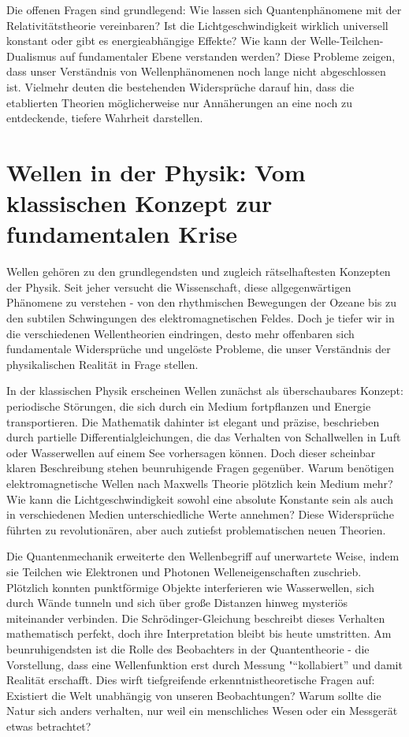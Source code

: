 Die offenen Fragen sind grundlegend: Wie lassen sich Quantenphänomene mit der Relativitätstheorie vereinbaren? Ist die Lichtgeschwindigkeit wirklich universell konstant oder gibt es
energieabhängige Effekte? Wie kann der Welle-Teilchen-Dualismus auf fundamentaler Ebene verstanden werden? Diese Probleme zeigen, dass unser Verständnis von Wellenphänomenen noch lange
nicht abgeschlossen ist. Vielmehr deuten die bestehenden Widersprüche darauf hin, dass die etablierten Theorien möglicherweise nur Annäherungen an eine noch zu entdeckende, tiefere
Wahrheit darstellen.

\section{Wellen in der Physik: Vom klassischen Konzept zur fundamentalen Krise}
Wellen gehören zu den grundlegendsten und zugleich rätselhaftesten Konzepten der Physik. Seit jeher versucht die Wissenschaft, diese allgegenwärtigen Phänomene zu verstehen - von den
rhythmischen Bewegungen der Ozeane bis zu den subtilen Schwingungen des elektromagnetischen Feldes. Doch je tiefer wir in die verschiedenen Wellentheorien eindringen, desto mehr offenbaren
sich fundamentale Widersprüche und ungelöste Probleme, die unser Verständnis der physikalischen Realität in Frage stellen.

In der klassischen Physik erscheinen Wellen zunächst als überschaubares Konzept: periodische Störungen, die sich durch ein Medium fortpflanzen und Energie transportieren. Die Mathematik
dahinter ist elegant und präzise, beschrieben durch partielle Differentialgleichungen, die das Verhalten von Schallwellen in Luft oder Wasserwellen auf einem See vorhersagen können.
Doch dieser scheinbar klaren Beschreibung stehen beunruhigende Fragen gegenüber. Warum benötigen elektromagnetische Wellen nach Maxwells Theorie plötzlich kein Medium mehr? Wie kann die
Lichtgeschwindigkeit sowohl eine absolute Konstante sein als auch in verschiedenen Medien unterschiedliche Werte annehmen? Diese Widersprüche führten zu revolutionären, aber auch zutiefst
problematischen neuen Theorien.

Die Quantenmechanik erweiterte den Wellenbegriff auf unerwartete Weise, indem sie Teilchen wie Elektronen und Photonen Welleneigenschaften zuschrieb. Plötzlich konnten punktförmige Objekte
interferieren wie Wasserwellen, sich durch Wände tunneln und sich über große Distanzen hinweg mysteriös miteinander verbinden. Die Schrödinger-Gleichung beschreibt dieses Verhalten mathematisch
perfekt, doch ihre Interpretation bleibt bis heute umstritten. Am beunruhigendsten ist die Rolle des Beobachters in der Quantentheorie - die Vorstellung, dass eine Wellenfunktion erst durch
Messung "\enquote{kollabiert} und damit Realität erschafft. Dies wirft tiefgreifende erkenntnistheoretische Fragen auf: Existiert die Welt unabhängig von unseren Beobachtungen? Warum sollte die
Natur sich anders verhalten, nur weil ein menschliches Wesen oder ein Messgerät etwas betrachtet?

